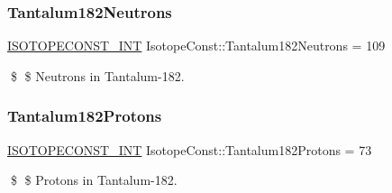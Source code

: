 \subsubsection{\texorpdfstring{Tantalum182\+Neutrons}{Tantalum182Neutrons}}
{\footnotesize\ttfamily \mbox{\hyperlink{group___isotope_const-_macros_ga5f18360b3e99483a35c32d789e62621c}{I\+S\+O\+T\+O\+P\+E\+C\+O\+N\+S\+T\+\_\+\+I\+NT}} Isotope\+Const\+::\+Tantalum182\+Neutrons = 109}

\$ \$ Neutrons in Tantalum-\/182. \mbox{\label{group___isotope_const-_tantalum-_ta182_ga5fdf0dbd3e31852fc03777559ea62378}} 
\subsubsection{\texorpdfstring{Tantalum182\+Protons}{Tantalum182Protons}}
{\footnotesize\ttfamily \mbox{\hyperlink{group___isotope_const-_macros_ga5f18360b3e99483a35c32d789e62621c}{I\+S\+O\+T\+O\+P\+E\+C\+O\+N\+S\+T\+\_\+\+I\+NT}} Isotope\+Const\+::\+Tantalum182\+Protons = 73}

\$ \$ Protons in Tantalum-\/182. 